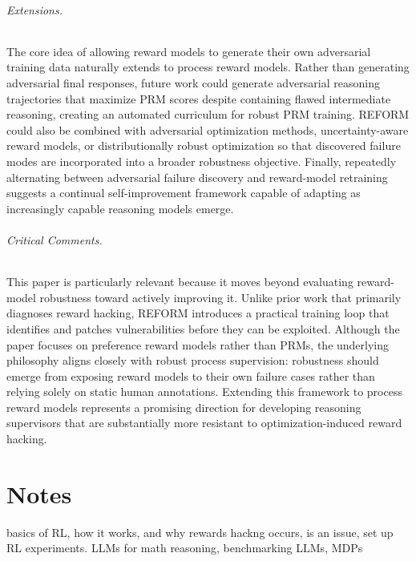 \documentclass[11pt]{article}
\begin{document}
\paragraph{Extensions.}
The core idea of allowing reward models to generate their own adversarial training data naturally extends to process reward models. Rather than generating adversarial final responses, future work could generate adversarial reasoning trajectories that maximize PRM scores despite containing flawed intermediate reasoning, creating an automated curriculum for robust PRM training. REFORM could also be combined with adversarial optimization methods, uncertainty-aware reward models, or distributionally robust optimization so that discovered failure modes are incorporated into a broader robustness objective. Finally, repeatedly alternating between adversarial failure discovery and reward-model retraining suggests a continual self-improvement framework capable of adapting as increasingly capable reasoning models emerge.

\paragraph{Critical Comments.}
This paper is particularly relevant because it moves beyond evaluating reward-model robustness toward actively improving it. Unlike prior work that primarily diagnoses reward hacking, REFORM introduces a practical training loop that identifies and patches vulnerabilities before they can be exploited. Although the paper focuses on preference reward models rather than PRMs, the underlying philosophy aligns closely with robust process supervision: robustness should emerge from exposing reward models to their own failure cases rather than relying solely on static human annotations. Extending this framework to process reward models represents a promising direction for developing reasoning supervisors that are substantially more resistant to optimization-induced reward hacking.

\newpage
\part{Notes}
basics of RL, how it works, and why rewards hackng occurs, is an issue, set up RL experiments. LLMs for math reasoning, benchmarking LLMs, MDPs
\end{document}
